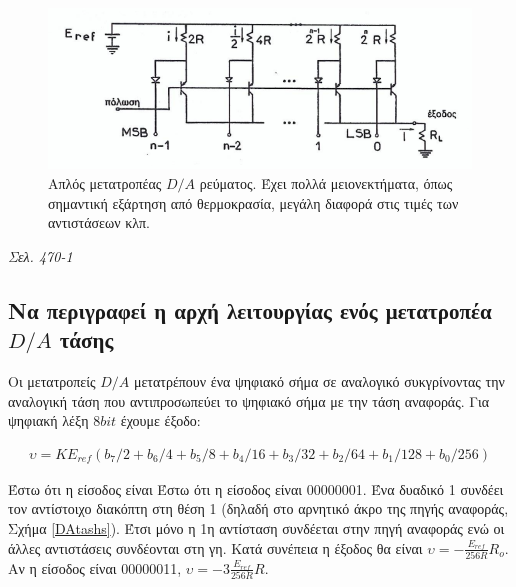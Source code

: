 \documentclass{article}
\begin{document}
\begin{figure}[h!]
    \includegraphics[width=\linewidth]{DArevma.png}
    \caption{Απλός μετατροπέας $D/A$ ρεύματος. Έχει πολλά μειονεκτήματα, όπως σημαντική εξάρτηση από θερμοκρασία, μεγάλη διαφορά στις τιμές των αντιστάσεων κλπ.}
    \label{DArevmatos}
\end{figure}

\emph{Σελ. 470-1}

\subsection{Να περιγραφεί η αρχή λειτουργίας ενός μετατροπέα $D/A$ τάσης}
Οι μετατροπείς $D/A$ μετατρέπουν ένα ψηφιακό σήμα σε αναλογικό συκγρίνοντας την αναλογική τάση που αντιπροσωπεύει το ψηφιακό σήμα με την τάση αναφοράς. Για ψηφιακή λέξη $8bit$ έχουμε
έξοδο: 

\begin{align*}
    \upsilon = K E_{ref} \left( b_7/2 + b_6/4 + b_5/8 + b_4/16 +b_3/32 + b_2/64 + b_1/128 + b_0/256 \right)
\end{align*}

Έστω ότι η είσοδος είναι Έστω ότι η είσοδος είναι 00000001. Ένα δυαδικό 1 συνδέει τον αντίστοιχο διακόπτη στη θέση 1 (δηλαδή στο αρνητικό άκρο της πηγής αναφοράς, Σχήμα \ref{DAtashs}). Έτσι
μόνο η 1η αντίσταση συνδέεται στην πηγή αναφοράς ενώ οι άλλες αντιστάσεις συνδέονται στη γη. Κατά συνέπεια η έξοδος θα είναι $\upsilon = -\frac{E_{ref}}{256R}R_o$. Αν η είσοδος είναι
00000011, $\upsilon = -3\frac{E_{ref}}{256R}R$.
\end{document}
